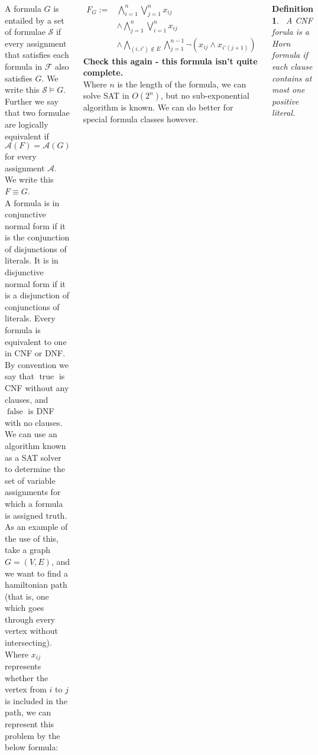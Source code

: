 \documentclass{tikzposter} %
\DeclareMathOperator{\true}{true}
\DeclareMathOperator{\false}{false}
\newtheorem{definition}{Definition}
\begin{document}
\begin{columns}
{  A formula $G$ is entailed by a set of formulae $\mathcal{S}$ if every assignment that satisfies each formula in $\mathcal{F}$ also satisfies $G$. We write this $\mathcal{S} \vDash G$. Further we say that two formulae are logically equivalent if $\mathcal{A}(F) = \mathcal{A}(G)$ for every assignment $\mathcal{A}$. We write this $F \equiv G$. \\

  A formula is in conjunctive normal form if it is the conjunction of disjunctions of literals. It is in disjunctive normal form if it is a disjunction of conjunctions of literals. Every formula is equivalent to one in CNF or DNF. \\

  By convention we say that $\true$ is CNF without any clauses, and $\false$ is DNF with no clauses. \\

  We can use an algorithm known as a SAT solver to determine the set of variable assignments for which a formula is assigned truth. As an example of the use of this, take a graph $G = (V,E)$, and we want to find a hamiltonian path (that is, one which goes through every vertex without intersecting). Where $x_{ij}$ represents whether the vertex from $i$ to $j$ is included in the path, we can represent this problem by the below formula:

  \begin{align*}
    F_{G} :=& \bigwedge_{i=1}^{n} \bigvee_{j=1}^{n} x_{ij} \\
             &\land \bigwedge_{j=1}^{n} \bigvee_{i=1}^{n} x_{ij} \\
    &\land \bigwedge_{(i,i') \notin E} \bigwedge_{j=1}^{n-1} \neg(x_{ij} \land x_{i'(j+1)})
  \end{align*}
  \textbf{Check this again - this formula isn't quite complete.} \\

  Where $n$ is the length of the formula, we can solve SAT in $O(2^{n})$, but no sub-exponential algorithm is known. We can do better for special formula classes however. \\

  \begin{definition}
  \ A CNF forula is a Horn formula if each clause contains at most one positive literal.
  \end{definition}
  \hphantom{}

}
\end{columns}
\end{document}
